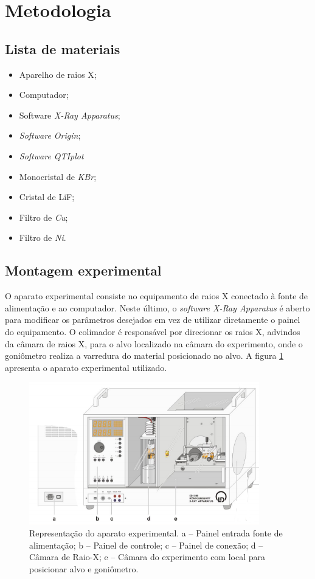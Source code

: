 \documentclass[article,12pt,openright,oneside,a4paper,brazil]{abntex2}
\begin{document}
\section{Metodologia}
    \subsection{Lista de materiais}
        \begin{itemize}
    \item Aparelho de raios X;
    \item Computador;
    \item Software \textit{X-Ray Apparatus};
    \item \textit{Software Origin};
    \item \textit{Software QTIplot}
    \item Monocristal de \textit{KBr};
    \item Cristal de LiF;
    \item Filtro de \textit{Cu};
    \item Filtro de \textit{Ni}.

\end{itemize}

    \subsection{Montagem experimental}
        O aparato experimental consiste no equipamento de raios X conectado à fonte de alimentação e ao computador. Neste último, o \textit{software X-Ray Apparatus} é aberto para modificar os parâmetros desejados em vez de utilizar diretamente o painel do equipamento. O colimador é responsável por direcionar os raios X, advindos da câmara de raios X, para o alvo localizado na câmara do experimento, onde o goniômetro realiza a varredura do material posicionado no alvo. A figura \ref{fig:aparatoexp} apresenta o aparato experimental utilizado. 
            \begin{figure}[H]
                \centering
                \includegraphics[width=10cm]{aparatoexp.png}
                \caption{Representação do aparato experimental. a – Painel entrada fonte de alimentação; b – Painel de controle; c – Painel de conexão; d – Câmara de Raio-X; e – Câmara do experimento com local para posicionar alvo e goniômetro.}
                \label{fig:aparatoexp}
            \end{figure}
            
\end{document}
